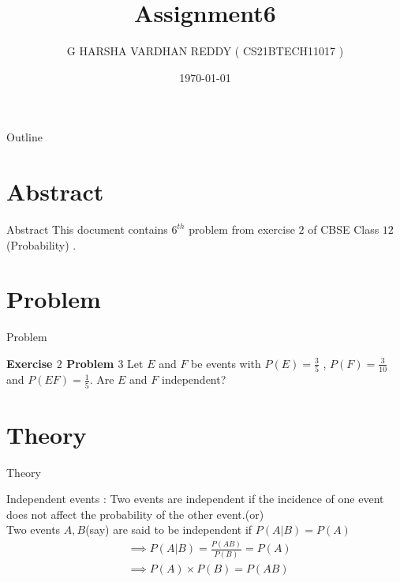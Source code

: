 \documentclass{beamer}
\title{Assignment6}
\author[CS21BTECH11017]{G HARSHA VARDHAN REDDY ( CS21BTECH11017 )}
\date{\today}
\begin{document}
\begin{frame}
    \titlepage 
\end{frame}
\begin{frame}{Outline}
    \tableofcontents
\end{frame}


\section{Abstract}
\begin{frame}{Abstract}
This document contains $6^{th}$ problem from exercise $2$ of CBSE Class $12$ (Probability) .
\end{frame}
\section{Problem}
\begin{frame}{Problem}

\textbf{Exercise $2$ Problem $3$ }Let $E$ and $F$ be events with $P(E)=\frac{3}{5}$ , $ P(F)=\frac{3}{10}$ and $P(EF)=\frac{1}{5}.$ Are
$E$ and $F$ independent?
\end{frame}

\section{Theory}
\begin{frame}{Theory}
\begin{block}{Independent events :}
Two events are independent if the incidence of one event does not affect the probability of the other event.(or)\\
Two events $A,B$(say) are said to be independent if $P(A|B)=P(A) $
\begin{align}
    &\implies P(A|B)=\frac{P(AB)}{P(B)}=P(A)\\
    &\implies P(A)\times P(B)=P(AB)
\end{align}
\end{block}
\end{frame} 
\end{document}
